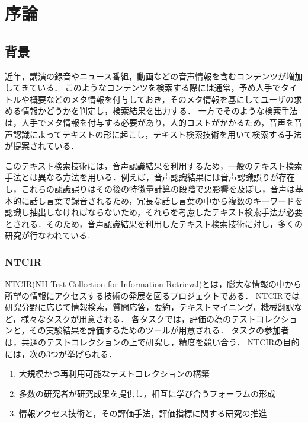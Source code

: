 ﻿%

\chapter{序論} %
\section{背景}
近年，講演の録音やニュース番組，動画などの音声情報を含むコンテンツが増加してきている．
このようなコンテンツを検索する際には通常，予め人手でタイトルや概要などのメタ情報を付与しておき，そのメタ情報を基にしてユーザの求める情報かどうかを判定し，検索結果を出力する．
一方でそのような検索手法は，人手でメタ情報を付与する必要があり，人的コストがかかるため，音声を音声認識によってテキストの形に起こし，テキスト検索技術を用いて検索する手法が提案されている．

このテキスト検索技術には，音声認識結果を利用するため，一般のテキスト検索手法とは異なる方法を用いる．例えば，音声認識結果には音声認識誤りが存在し，これらの認識誤りはその後の特徴量計算の段階で悪影響を及ぼし，音声は基本的に話し言葉で録音されるため，冗長な話し言葉の中から複数のキーワードを認識し抽出しなければならないため，それらを考慮したテキスト検索手法が必要とされる．そのため，音声認識結果を利用したテキスト検索技術に対し，多くの研究が行なわれている. 

\subsection{NTCIR}
NTCIR(NII Test Collection for Information Retrieval)\cite{NTCIR}とは，膨大な情報の中から所望の情報にアクセスする技術の発展を図るプロジェクトである．
NTCIRでは研究分野に応じて情報検索，質問応答，要約，テキストマイニング，機械翻訳など，様々なタスクが用意される．
各タスクでは，評価の為のテストコレクションと，その実験結果を評価するためのツールが用意される．
タスクの参加者は，共通のテストコレクションの上で研究し，精度を競い合う．
NTCIRの目的には，次の3つが挙げられる．
\begin{enumerate}
    \item 大規模かつ再利用可能なテストコレクションの構築
    \item 多数の研究者が研究成果を提供し，相互に学び合うフォーラムの形成
    \item 情報アクセス技術と，その評価手法，評価指標に関する研究の推進
\end{enumerate}

